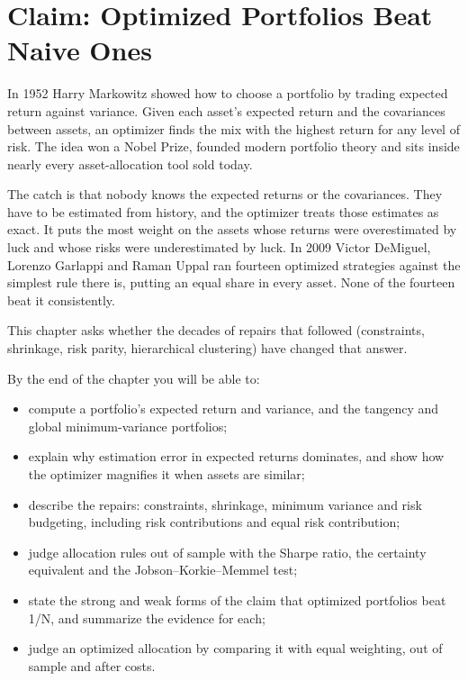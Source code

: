 \makeatletter
{}
\makeatother

\chapter{Claim: Optimized Portfolios Beat Naive Ones}
\label{ch:19}

In 1952 Harry Markowitz showed how to choose a portfolio by trading expected return against variance. Given each asset's expected return and the covariances between assets, an optimizer finds the mix with the highest return for any level of risk. The idea won a Nobel Prize, founded modern portfolio theory and sits inside nearly every asset-allocation tool sold today.

The catch is that nobody knows the expected returns or the covariances. They have to be estimated from history, and the optimizer treats those estimates as exact. It puts the most weight on the assets whose returns were overestimated by luck and whose risks were underestimated by luck. In 2009 Victor DeMiguel, Lorenzo Garlappi and Raman Uppal ran fourteen optimized strategies against the simplest rule there is, putting an equal share in every asset. None of the fourteen beat it consistently.

This chapter asks whether the decades of repairs that followed (constraints, shrinkage, risk parity, hierarchical clustering) have changed that answer.

By the end of the chapter you will be able to:

\begin{itemize}
  \item compute a portfolio's expected return and variance, and the tangency and global minimum-variance portfolios;
  \item explain why estimation error in expected returns dominates, and show how the optimizer magnifies it when assets are similar;
  \item describe the repairs: constraints, shrinkage, minimum variance and risk budgeting, including risk contributions and equal risk contribution;
  \item judge allocation rules out of sample with the Sharpe ratio, the certainty equivalent and the Jobson--Korkie--Memmel test;
  \item state the strong and weak forms of the claim that optimized portfolios beat 1/N, and summarize the evidence for each;
  \item judge an optimized allocation by comparing it with equal weighting, out of sample and after costs.
\end{itemize}

